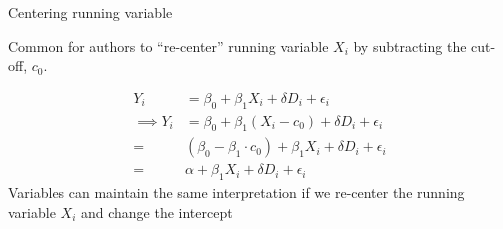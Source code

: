 \begin{frame}{Centering running variable}

Common for authors to ``re-center'' running variable $X_i$ by subtracting the cut-off, $c_0$. 

\begin{align*}
    Y_i &= \beta_0 + \beta_1 X_i + \delta D_i + \epsilon_i \\
    \implies Y_i &= \beta_0 + \beta_1 (X_i - c_0) + \delta D_i + \epsilon_i \\
    =& (\beta_0 - \beta_1 \cdot c_0) + \beta_1 X_i + \delta D_i + \epsilon_i \\
    =& \alpha + \beta_1 X_i + \delta D_i + \epsilon_i
\end{align*}
Variables can maintain the same interpretation if we re-center the running variable $X_i$ and change the intercept


\end{frame}

